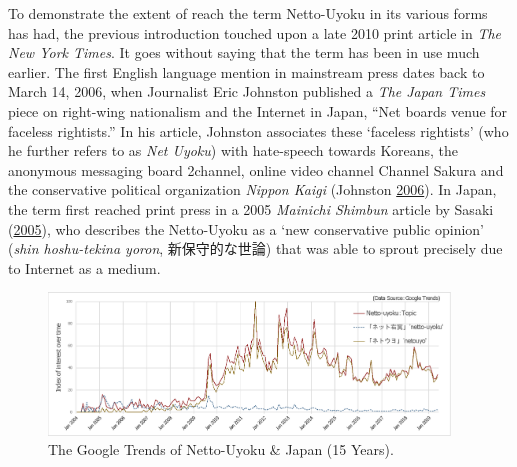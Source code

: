 \documentclass[10pt,british,A4paper,,openany]{memoir}
\begin{document}
To demonstrate the extent of reach the term Netto-Uyoku in its various
forms has had, the previous introduction touched upon a late 2010 print
article in \emph{The New York Times}. It goes without saying that the
term has been in use much earlier. The first English language mention in
mainstream press dates back to March 14, 2006, when Journalist Eric
Johnston published a \emph{The Japan Times} piece on right-wing
nationalism and the Internet in Japan, ``Net boards venue for faceless
rightists.'' In his article, Johnston associates these `faceless
rightists' (who he further refers to as \emph{Net Uyoku}) with
hate-speech towards Koreans, the anonymous messaging board 2channel,
online video channel Channel Sakura and the conservative political
organization \emph{Nippon Kaigi} (Johnston
\protect\hyperlink{ref-johnston_net_2006}{2006}). In Japan, the term
first reached print press in a 2005 \emph{Mainichi Shimbun} article by
Sasaki (\protect\hyperlink{ref-sasaki_netto-uyoku_2005}{2005}), who
describes the Netto-Uyoku as a `new conservative public opinion'
(\emph{shin hoshu-tekina yoron}, 新保守的な世論) that was able to sprout
precisely due to Internet as a medium.

\begin{figure}[!htb]
 \centering
  \caption{\label{fig:nettouyoku} The Google Trends of Netto-Uyoku \& Japan (15 Years).}
 \includegraphics[width=0.95\textwidth,trim=4 4 4 4,clip]{images/nettouyoku2.eps}
\end{figure}
\end{document}
